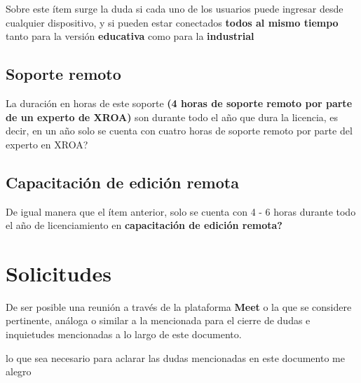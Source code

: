 \documentclass{article}
\begin{document}
Sobre este ítem surge la duda si cada uno de los usuarios puede ingresar desde cualquier dispositivo, y si pueden estar conectados \textbf{todos al mismo tiempo} tanto para la versión \textbf{educativa} como para la \textbf{industrial}

\subsection*{\textbf{Soporte remoto}}

La duración en horas de este soporte \textbf{(4 horas de soporte remoto por parte de un experto de XROA)} son durante todo el año que dura la licencia, es decir, en un año solo se cuenta con cuatro horas de soporte remoto por parte del experto en XROA?

\subsection*{\textbf{Capacitación de edición remota}}

De igual manera que el ítem anterior, solo se cuenta con 4 - 6 horas durante todo el año de licenciamiento en \textbf{capacitación de edición remota?}

\section*{Solicitudes}

De ser posible una reunión a través de la plataforma \textbf{Meet} o la que se considere pertinente, análoga o similar a la mencionada para el cierre de dudas e inquietudes mencionadas a lo largo de este documento. 

lo que sea necesario para aclarar las dudas mencionadas en este documento me alegro

  
    
\end{document}
